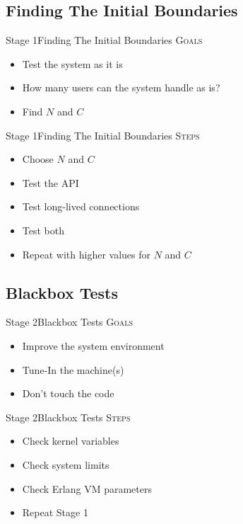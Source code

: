 \documentclass[utf8]{beamer}
\begin{document}
\subsection{Finding The Initial Boundaries}
\begin{frame}{Stage 1}{Finding The Initial Boundaries}
	\textsc{Goals}
	\begin{itemize}
		\item Test the system as it is
		\item How many users can the system handle \alert{as is}?
		\item Find $N$ and $C$
	\end{itemize}
\end{frame}
\begin{frame}{Stage 1}{Finding The Initial Boundaries}
	\textsc{Steps}
	\begin{itemize}
		\item Choose $N$ and $C$
		\item Test the API
		\item Test long-lived connections
		\item Test both
		\pause
		\item Repeat with higher values for $N$ and $C$
	\end{itemize}
\end{frame}

\subsection{Blackbox Tests}
\begin{frame}{Stage 2}{Blackbox Tests}
	\textsc{Goals}
	\begin{itemize}
		\item Improve the system environment
		\item Tune-In the machine(s)
		\item \alert{Don't} touch the code
	\end{itemize}
\end{frame}
\begin{frame}{Stage 2}{Blackbox Tests}
	\textsc{Steps}
	\begin{itemize}
		\item Check kernel variables
		\item Check system limits
		\item Check Erlang VM parameters
		\pause
		\item Repeat Stage 1
	\end{itemize}
\end{frame}
\end{document}
